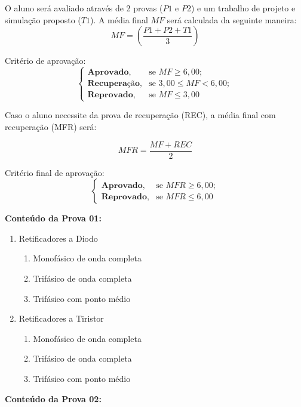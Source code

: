 \documentclass[
	article,			%
	12pt,				%
	twoside,			%
	a4paper,			%
	english,			%
	brazil,				%
	sumario=tradicional
]{abntex2-modelo-plano-de-aula}
\begin{document}
O aluno será avaliado através de 2 provas ($P1$ e $P2$) e um trabalho de projeto e simulação proposto ($T1$).
A média final $MF$ será calculada da seguinte maneira:
\[
MF = \left( {\frac{{P1 + P2 + T1}}{3}} \right)
\]

Critério de aprovação:
\[
\begin{cases}
\textbf{Aprovado},& \text{se   } MF \ge 6,00;\\
\textbf{Recuperação},& \text{se   } 3,00 \le MF < 6,00;\\
\textbf{Reprovado}, & \text{se   } MF \le 3,00
\end{cases}
\]

Caso o aluno necessite da prova de recuperação (REC), a média final com recuperação (MFR) será: 

\[MFR = \frac{{MF + REC}}{2}\]

Critério final de aprovação:
\[
\begin{cases}
\textbf{Aprovado},& \text{se   } MFR \ge 6,00;\\
\textbf{Reprovado}, & \text{se   } MFR \le 6,00
\end{cases}
\]


\newpage
\textbf{Conteúdo da Prova 01:}
\begin{enumerate}      	
	\item {Retificadores a Diodo}
	\begin{enumerate}
		\item Monofásico de onda completa
		\item Trifásico de onda completa
		\item Trifásico com ponto médio
	\end{enumerate}
	\item Retificadores a Tiristor
	\begin{enumerate}
		\item Monofásico de onda completa
		\item Trifásico de onda completa
		\item Trifásico com ponto médio
	\end{enumerate}       		
\end{enumerate}

\textbf{Conteúdo da Prova 02:}  
\end{document}
